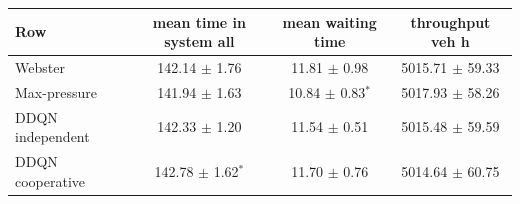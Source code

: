 \begin{tabular}{lccc}
\toprule
Row & mean time in system all & mean waiting time & throughput veh h \\
\midrule
Webster & 142.14 $\pm$ 1.76 & 11.81 $\pm$ 0.98 & 5015.71 $\pm$ 59.33 \\
Max-pressure & 141.94 $\pm$ 1.63 & 10.84 $\pm$ 0.83$^{*}$ & 5017.93 $\pm$ 58.26 \\
DDQN independent & 142.33 $\pm$ 1.20 & 11.54 $\pm$ 0.51 & 5015.48 $\pm$ 59.59 \\
DDQN cooperative & 142.78 $\pm$ 1.62$^{*}$ & 11.70 $\pm$ 0.76 & 5014.64 $\pm$ 60.75 \\
\bottomrule
\end{tabular}
